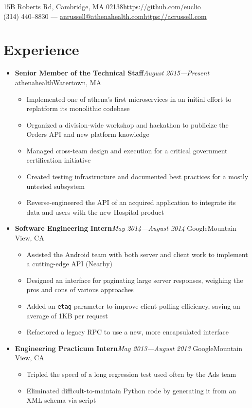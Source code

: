\documentclass[10pt]{article}
\makeatletter
\newcommand{\name}{Andrew C. Russell}
\newcommand{\address}{15B Roberts Rd, Cambridge, MA 02138}
\newcommand{\telephone}{(314) 440--8830}
\newcommand{\email}{anrussell@athenahealth.com}
\newcommand{\website}{https://acrussell.com}
\newcommand{\github}{https://github.com/euclio}
\newcommand\contact{{
    \begin{center}\noindent{\LARGE\textbf{\name}}\end{center}
    \address{}\hfill\url{\github}\\
    \telephone{} --- \url{\email}\hfill\url{\website}%
}}
\newcommand\divider{{
        \noindent\hrulefill{}%
}}
\newcommand\experienceentry[4]{%
\textbf{#3}\hfill\textit{#4}%
\newline#1\hfill#2%
}
\makeatother
\begin{document}
\pagestyle{empty}

\contact{}

\divider{}

\section*{Experience}
\begin{itemize}[label=,leftmargin=0pt]
    \item \experienceentry{athenahealth}{Watertown, MA}{Senior Member of the Technical Staff}{August 2015---Present}
        \begin{itemize}[topsep=4pt]
        \item Implemented one of athena's first microservices in an initial
        effort to replatform its monolithic codebase
        \item Organized a division-wide workshop and hackathon to publicize the
        Orders API and new platform knowledge
        \item Managed cross-team design and execution for a critical
        government certification initiative
        \item Created testing infrastructure and documented best practices for a
        mostly untested subsystem
        \item Reverse-engineered the API of an acquired application to integrate
        its data and users with the new Hospital product
        \end{itemize}
    \item \experienceentry{Google}{Mountain View, CA}
        {Software Engineering Intern}{May 2014---August 2014}
        \begin{itemize}[topsep=4pt]
            \item Assisted the Android team with both server and client work to
                implement a cutting-edge API (Nearby)
            \item Designed an interface for paginating large server responses,
            weighing the pros and cons of various approaches
            \item Added an \texttt{etag} parameter to improve client polling efficiency,
            saving an average of 1KB per request
            \item Refactored a legacy RPC to use a new, more encapsulated
            interface
        \end{itemize}
    \item \experienceentry{Google}{Mountain View, CA}
        {Engineering Practicum Intern}{May 2013---August 2013}
        \begin{itemize}[topsep=4pt]
            \item Tripled the speed of a long regression test used often by the
                Ads team
                \item Eliminated difficult-to-maintain Python code by generating
                it from an XML schema via script
        \end{itemize}
\end{itemize}
\end{document}
